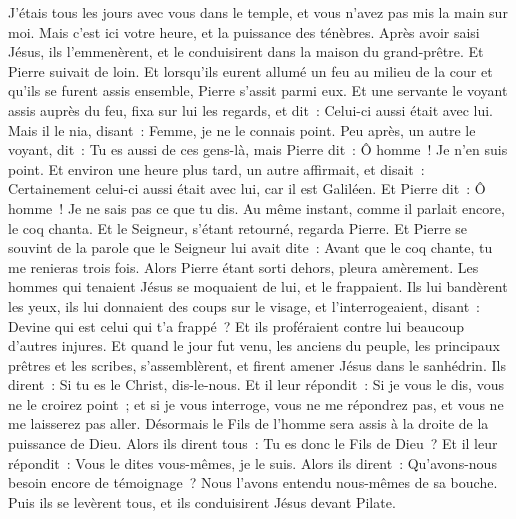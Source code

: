 \begin{multicols}{2}
J'étais tous les jours avec vous dans le temple, et vous n'avez pas mis la main sur moi. Mais c'est ici votre heure, et la puissance des ténèbres.
Après avoir saisi Jésus, ils l'emmenèrent, et le conduisirent dans la maison du grand-prêtre. Et Pierre suivait de loin.
Et lorsqu'ils eurent allumé un feu au milieu de la cour et qu'ils se furent assis ensemble, Pierre s'assit parmi eux.
Et une servante le voyant assis auprès du feu, fixa sur lui les regards, et dit~: Celui-ci aussi était avec lui.
Mais il le nia, disant~: Femme, je ne le connais point.
Peu après, un autre le voyant, dit~: Tu es aussi de ces gens-là, mais Pierre dit~: Ô homme~! Je n'en suis point.
Et environ une heure plus tard, un autre affirmait, et disait~: Certainement celui-ci aussi était avec lui, car il est Galiléen.
Et Pierre dit~: Ô homme~! Je ne sais pas ce que tu dis. Au même instant, comme il parlait encore, le coq chanta.
Et le Seigneur, s'étant retourné, regarda Pierre. Et Pierre se souvint de la parole que le Seigneur lui avait dite~: Avant que le coq chante, tu me renieras trois fois.
Alors Pierre étant sorti dehors, pleura amèrement.
Les hommes qui tenaient Jésus se moquaient de lui, et le frappaient.
Ils lui bandèrent les yeux, ils lui donnaient des coups sur le visage, et l'interrogeaient, disant~: Devine qui est celui qui t'a frappé~?
Et ils proféraient contre lui beaucoup d'autres injures.
Et quand le jour fut venu, les anciens du peuple, les principaux prêtres et les scribes, s'assemblèrent, et firent amener Jésus dans le sanhédrin.
Ils dirent~: Si tu es le Christ, dis-le-nous. Et il leur répondit~: Si je vous le dis, vous ne le croirez point~;
et si je vous interroge, vous ne me répondrez pas, et vous ne me laisserez pas aller.
Désormais le Fils de l'homme sera assis à la droite de la puissance de Dieu.
Alors ils dirent tous~: Tu es donc le Fils de Dieu~? Et il leur répondit~: Vous le dites vous-mêmes, je le suis.
Alors ils dirent~: Qu'avons-nous besoin encore de témoignage~? Nous l'avons entendu nous-mêmes de sa bouche.
\VerseOne{}Puis ils se levèrent tous, et ils conduisirent Jésus devant Pilate.

\end{multicols}
